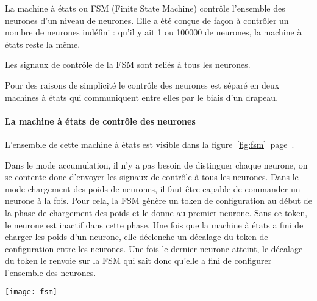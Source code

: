 La machine à états ou FSM (Finite State Machine) contrôle l'ensemble des neurones
d'un niveau de neurones.
Elle a été conçue de façon à contrôler un nombre de neurones indéfini : qu'il y
ait 1 ou 100000 de neurones, la machine à états reste la même.

Les signaux de contrôle de la FSM sont reliés à tous les neurones.

Pour des raisons de simplicité le contrôle des neurones est séparé en deux
machines à états qui communiquent entre elles par le biais d'un drapeau.

\paragraph{La machine à états de contrôle des neurones\\}

L'ensemble de cette machine à états est visible dans la
figure~\ref{fig:fsm}~page~\pageref{fig:fsm}.

Dans le mode accumulation,
il n'y a pas besoin de distinguer chaque neurone, on se contente donc d'envoyer
les signaux de contrôle à tous les neurones.
Dans le mode chargement des poids de neurones, il faut être capable de commander
un neurone à la fois. Pour cela, la FSM génère un token de configuration au début
de la phase de chargement des poids et le donne au premier neurone. Sans ce token,
le neurone est inactif dans cette phase. Une fois que la machine à états a fini de
charger les poids d'un neurone, elle déclenche un décalage du token de configuration
entre les neurones. Une fois le dernier neurone atteint, le décalage du token
le renvoie sur la FSM qui sait donc qu'elle a fini de configurer l'ensemble des
neurones.

\begin{sidewaysfigure}
	\texttt{[image: fsm]}
	\caption{Machine à états de contrôle des neurones}
	\label{fig:fsm}
\end{sidewaysfigure}

